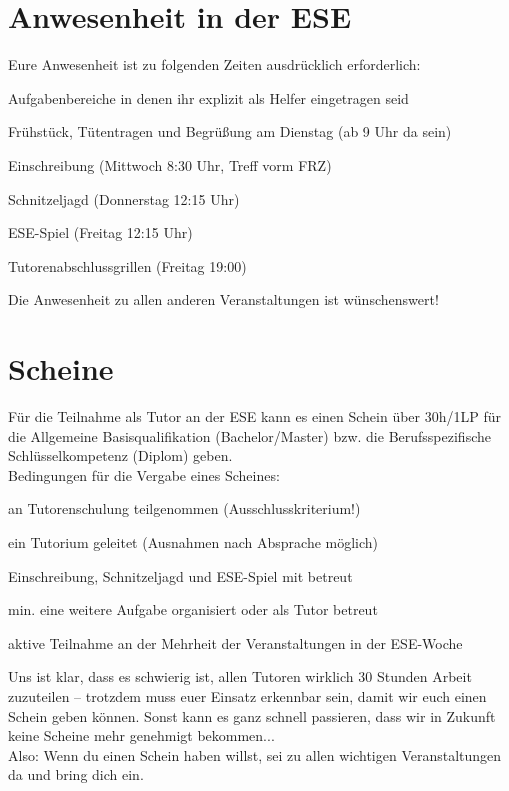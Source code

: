 \documentclass[a4paper,12pt]{report}
\begin{document}
\section{Anwesenheit in der ESE}
Eure Anwesenheit ist zu folgenden Zeiten ausdrücklich erforderlich:
\begin{itemize*}
	\item Aufgabenbereiche in denen ihr explizit als Helfer eingetragen seid
	\item Frühstück, Tütentragen und Begrüßung am Dienstag (ab 9 Uhr da sein)
	\item Einschreibung (Mittwoch 8:30 Uhr, Treff vorm FRZ)
	\item Schnitzeljagd (Donnerstag 12:15 Uhr)
	\item ESE-Spiel (Freitag 12:15 Uhr)
	\item Tutorenabschlussgrillen (Freitag 19:00)
\end{itemize*}
Die Anwesenheit zu allen anderen Veranstaltungen ist wünschenswert!

\section{Scheine}
Für die Teilnahme als Tutor an der ESE kann es einen Schein über 30h/1LP für die Allgemeine Basisqualifikation (Bachelor/Master) bzw. die Berufsspezifische Schlüsselkompetenz (Diplom) geben.\\
Bedingungen für die Vergabe eines Scheines:
\begin{itemize*}
	\item an Tutorenschulung teilgenommen (Ausschlusskriterium!)
	\item ein Tutorium geleitet (Ausnahmen nach Absprache möglich)
	\item Einschreibung, Schnitzeljagd und ESE-Spiel mit betreut
	\item min. eine weitere Aufgabe organisiert oder als Tutor betreut
	\item aktive Teilnahme an der Mehrheit der Veranstaltungen in der ESE-Woche
\end{itemize*}
Uns ist klar, dass es schwierig ist, allen Tutoren wirklich 30 Stunden Arbeit zuzuteilen -- trotzdem muss euer Einsatz erkennbar sein, damit wir euch einen Schein geben können. Sonst kann es ganz schnell passieren, dass wir in Zukunft keine Scheine mehr genehmigt bekommen...\\
Also: Wenn du einen Schein haben willst, sei zu allen wichtigen Veranstaltungen da und bring dich ein.
\end{document}

